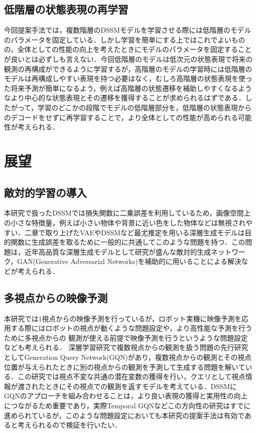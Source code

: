 \subsection{低階層の状態表現の再学習}
今回提案手法では，複数階層のDSSMモデルを学習させる際には低階層のモデルのパラメータを固定している．しかし学習を簡単にする上ではこれでよいものの，全体としての性能の向上を考えたときにモデルのパラメータを固定することが良いとは必ずしも言えない．今回低階層のモデルは低次元の状態表現で将来の観測の再構成ができるように学習するが，高階層のモデルの学習時には低階層のモデルは再構成しやすい表現を持つ必要はなく，むしろ高階層の状態表現を使った将来予測が簡単になるよう，例えば高階層の状態遷移を補助しやすくなるようなより中心的な状態表現とその遷移を獲得することが求められるはずである．したがって，学習のどこかの段階でモデルの低階層部分を，低階層の状態表現からのデコードをせずに再学習することで，より全体としての性能が高められる可能性が考えられる．

\section{展望}
\subsection{敵対的学習の導入}
本研究で扱ったDSSMでは損失関数に二乗誤差を利用しているため，画像空間上の小さな特徴量，例えば小さい物体や背景に近い色をした物体などは無視されやすい．二章で取り上げたVAEやDSSMなど最尤推定を用いる深層生成モデルは目的関数に生成誤差を取るために一般的に共通してこのような問題を持つ．この問題は，近年高品質な深層生成モデルとして研究が盛んな敵対的生成ネットワーク，GAN(Generative Adversarial Networks)\cite{goodfellow2014generative}を補助的に用いることによる解決などが考えられる．

\subsection{多視点からの映像予測}
本研究では1視点からの映像予測を行っているが，ロボット実機に映像予測を応用する際にはロボットの視点が動くような問題設定や，より高性能な予測を行うために多視点からの
観測が使える前提で映像予測を行うというような問題設定なども考えられる．
深層学習研究で複数視点からの観測を扱う問題の先行研究としてGeneration Query Network(GQN)\cite{eslami2018neural}があり，複数視点からの観測とその視点位置が与えられたときに別の視点からの観測を予測して生成する問題を解いている．この研究では視点不変な共通の潜在変数の獲得を行い，クエリとして視点情報が渡されたときにその視点での観測を返すモデルを考えている．DSSMにGQNのアプローチを組み合わせることは，より良い表現の獲得と実用性の向上につながるため重要であり，実際Temporal GQN\cite{singh2019sequential}などこの方向性の研究はすでに進められているが，このような問題設定においても本研究の提案手法は有効であると考えられるので検証を行いたい．

